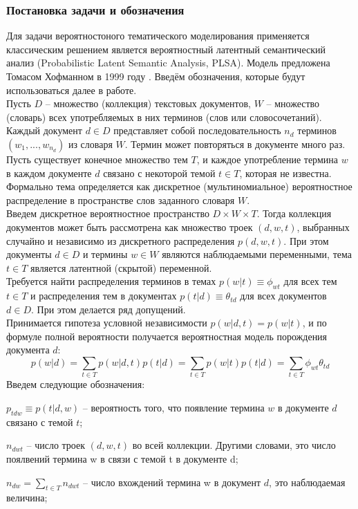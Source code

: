 \documentclass[12pt]{article}
\begin{document}
\subsubsection{Постановка задачи и обозначения}
\label{subsec:denotes}
Для  задачи вероятностоного тематического моделирования применяется  классическим решением является вероятностный латентный семантический анализ (Probabilistic Latent Semantic Analysis, PLSA). Модель предложена Томасом Хофманном в 1999 году \cite{plsadef2}. Введём обозначения, которые будут использоваться далее в работе.\\
Пусть $D$ -- множество (коллекция) текстовых документов, $W$ -- множество (словарь) всех употребляемых в них терминов (слов или словосочетаний). Каждый документ $d \in D$ представляет собой последовательность $n_d$ терминов $(w_1, . . . , w_{n_d})$ из словаря $W$. Термин может повторяться в документе много раз.
Пусть существует конечное множество тем $T$, и каждое употребление термина $w$ в каждом документе $d$ связано с некоторой темой $t \in T$, которая не известна. Формально тема определяется как дискретное (мультиномиальное) вероятностное распределение в пространстве слов заданного словаря $W$.\\
Введем дискретное вероятностное пространство $D \times W \times T$. Тогда коллекция документов может быть рассмотрена как множество троек $(d, w, t)$, выбранных случайно и независимо из дискретного распределения $p(d, w, t)$. При этом документы $d \in D$ и термины $w \in W$ являются наблюдаемыми переменными, тема $t \in T$ является латентной (скрытой) переменной.\\
Требуется найти распределения терминов в темах $p(w|t) \equiv \phi_{wt}$ для всех тем $t \in T$ и распределения тем в документах $p(t|d) \equiv \theta_{td}$ для всех документов $d \in D$. При этом делается ряд допущений.\\
Принимается гипотеза условной независимости $p(w|d,t) = p(w|t)$, и  по формуле полной вероятности получается вероятностная модель порождения документа $d$:
\[
p(w|d) = \sum_{t \in T} p(w|d,t)p(t|d) = \sum_{t \in T}p(w|t)p(t|d)=\sum_{t \in T}\phi_{wt}\theta_{td}
\]
Введем следующие обозначения:

$p_{tdw} \equiv p(t|d,w)$ -- вероятность того, что появление термина $w$ в документе $d$ связано с темой $t$;

$n_{dwt}$ -- число троек $(d,w,t)$ во всей коллекции. Другими словами, это число поялвений термина w в связи с темой t в документе d;

$n_{dw} = \sum_{t \in T} n_{dwt}$ -- число вхождений термина w в документ $d$, это наблюдаемая величина;
\end{document}
